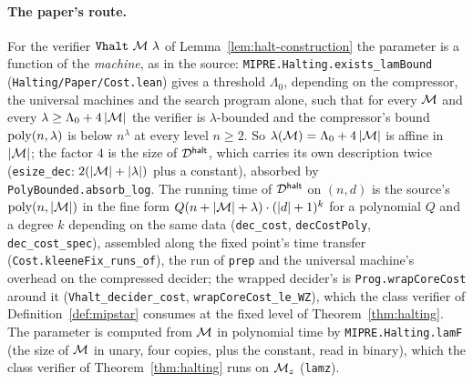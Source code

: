 \paragraph{The paper's route.} For the verifier $\texttt{Vhalt}\ \machine\ \lambda$ of
Lemma~\ref{lem:halt-construction} the parameter is a function of the \emph{machine}, as in
the source: \texttt{MIPRE.Halting.exists\_lamBound} (\texttt{Halting/Paper/Cost.lean})
gives a threshold $\Lambda_0$, depending on the compressor, the universal machines and the
search program alone, such that for every $\mathcal{M}$ and every
$\lambda \geq \Lambda_0 + 4\left\vert {\mathcal{M}} \right\vert$ the verifier is $\lambda$-bounded and the
compressor's bound $\mathrm{poly}(n, \lambda)$ is below $n^\lambda$ at every level $n \geq 2$. So
$\lambda(\mathcal{M}) = \Lambda_0 + 4\left\vert {\mathcal{M}} \right\vert$ is affine in $\left\vert {\mathcal{M}} \right\vert$; the
factor $4$ is the size of $\mathcal{D}^{\mathsf{halt}}$, which carries its own description twice
(\texttt{esize\_dec}: $2(\left\vert {\mathcal{M}} \right\vert + \left\vert {\lambda} \right\vert)$ plus a constant), absorbed
by \texttt{PolyBounded.absorb\_log}. The running time of $\mathcal{D}^{\mathsf{halt}}$ on $(n, d)$ is the
source's $\mathrm{poly}(n, \left\vert {\mathcal{M}} \right\vert)$ in the fine form
$Q(n + \left\vert {\mathcal{M}} \right\vert + \lambda) \cdot (\left\vert {d} \right\vert + 1)^k$ for a polynomial $Q$ and a degree
$k$ depending on the same data (\texttt{dec\_cost}, \texttt{decCostPoly},
\texttt{dec\_cost\_spec}), assembled along the fixed point's time transfer
(\texttt{Cost.kleeneFix\_runs\_of}), the run of \texttt{prep} and the universal machine's
overhead on the compressed decider; the wrapped decider's is
\texttt{Prog.wrapCoreCost} around it (\texttt{Vhalt\_decider\_cost},
\texttt{wrapCoreCost\_le\_WZ}), which the class verifier of Definition~\ref{def:mipstar}
consumes at the fixed level of Theorem~\ref{thm:halting}. The parameter is computed from
$\mathcal{M}$ in polynomial time by \texttt{MIPRE.Halting.lamF} (the size of $\mathcal{M}$ in
unary, four copies, plus the constant, read in binary), which the class verifier of
Theorem~\ref{thm:halting} runs on $\mathcal{M}_z$ (\texttt{lamz}).

\effortMedium

